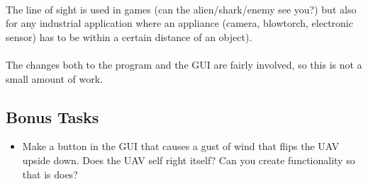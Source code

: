 \documentclass[11pt]{book}
\begin{document}
\paragraph{} The line of sight is used in games (can the alien/shark/enemy see you?) but also for any industrial application where an appliance (camera, blowtorch, electronic sensor) has to be within a certain distance of an object).

\paragraph{} The changes both to the program and the GUI are fairly involved, so this is not a small amount of work.

\subsection{Bonus Tasks}

\begin{itemize}
\item Make a button in the GUI that causes a gust of wind that flips the UAV upside down. Does the UAV self right itself? Can you create functionality so that is does?
\end{itemize}
\end{document}
